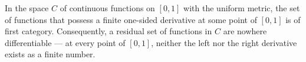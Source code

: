 In the space $C$ of continuous functions on $[0,1]$ with the uniform metric, the set of functions that possess a finite one-sided derivative at some point of $[0,1]$ is of first category. Consequently, a residual set of functions in $C$ are nowhere differentiable — at every point of $[0,1]$, neither the left nor the right derivative exists as a finite number.
